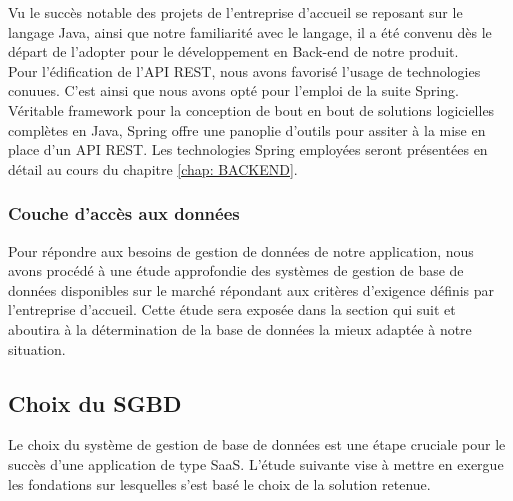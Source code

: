 \begin{spacing}{1.5}
Vu le succès notable des projets de l'entreprise d'accueil se reposant sur le langage Java, ainsi que notre familiarité avec le langage, il a été convenu dès le départ de l'adopter pour le développement en Back-end de notre produit.\\
Pour l'édification de l'API REST, nous avons favorisé l'usage de technologies conuues. C'est ainsi que nous avons opté pour l'emploi de la suite Spring. Véritable framework pour la conception de bout en bout de solutions logicielles complètes en Java, Spring offre une panoplie d'outils pour assiter à la mise en place d'un API REST. Les technologies Spring employées seront présentées en détail au cours du chapitre \ref{chap: BACKEND}.


\subsubsection*{Couche d'accès aux données}%
Pour répondre aux besoins de gestion de données de notre application, nous avons procédé à une étude approfondie des systèmes de gestion de base de données disponibles sur le marché répondant aux critères d'exigence définis par l'entreprise d'accueil. Cette étude sera exposée dans la section qui suit et aboutira à la détermination de la base de données la mieux adaptée à notre situation.

\subsection{Choix du SGBD}
Le choix du système de gestion de base de données est une étape cruciale pour le succès d'une application de type SaaS. L'étude suivante vise à mettre en exergue les fondations sur lesquelles s'est basé le choix de la solution retenue.


\end{spacing}
